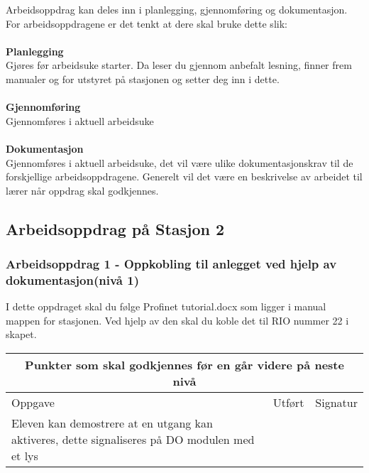 Arbeidsoppdrag kan deles inn i planlegging, gjennomføring og dokumentasjon.\\
For arbeidsoppdragene er det tenkt at dere skal bruke dette slik:\\\\
\textbf{Planlegging}\\
Gjøres før arbeidsuke starter. Da leser du gjennom anbefalt lesning, finner frem manualer og for  utstyret på stasjonen og setter deg inn i dette.\\ \\
\textbf{Gjennomføring}\\
Gjennomføres i aktuell arbeidsuke\\\\

\textbf{Dokumentasjon}\\
Gjennomføres i aktuell arbeidsuke, det vil være ulike dokumentasjonskrav til de forskjellige arbeidsoppdragene. Generelt vil det være en beskrivelse av arbeidet til lærer når oppdrag skal godkjennes. \\


\newpage
\subsection*{Arbeidsoppdrag på Stasjon 2}

\subsubsection*{Arbeidsoppdrag 1 -  Oppkobling til anlegget ved hjelp av dokumentasjon(nivå 1)}

I dette oppdraget skal du følge Profinet tutorial.docx som ligger i manual mappen  for stasjonen. Ved hjelp av den skal du koble det til RIO nummer 22 i skapet. 

\begin{center} \begin{tabular}{ | m{12cm} | m{1cm}| m{2cm} | } 
\hline
\multicolumn{3}{|c|}{Punkter som skal godkjennes før en går videre på neste nivå} \\
	\hline
	Oppgave	& Utført & Signatur \\ 
	\hline
Eleven kan demostrere at en utgang kan aktiveres, dette signaliseres på DO modulen med et lys& & \\ 
	\hline
\end{tabular}
\end{center}

